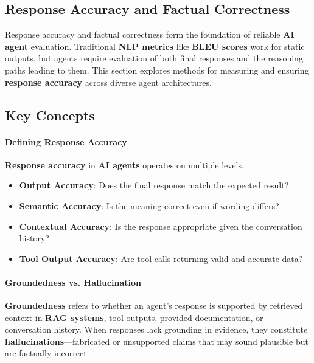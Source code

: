 
\begin{TNtwocol}

\section{Response Accuracy and Factual Correctness}
Response accuracy and factual correctness form the foundation of reliable \textbf{AI agent} evaluation. Traditional \textbf{NLP metrics} like \textbf{BLEU scores} work for static outputs, but agents require evaluation of both final responses and the reasoning paths leading to them. This section explores methods for measuring and ensuring \textbf{response accuracy} across diverse agent architectures.

\subsection*{Key Concepts}

\paragraph{\textbf{Defining Response Accuracy}}

\textbf{Response accuracy} in \textbf{AI agents} operates on multiple levels.

\begin{itemize}
\item \textbf{Output Accuracy}: Does the final response match the expected result?
\item \textbf{Semantic Accuracy}: Is the meaning correct even if wording differs?
\item \textbf{Contextual Accuracy}: Is the response appropriate given the conversation history?
\item \textbf{Tool Output Accuracy}: Are tool calls returning valid and accurate data?
\end{itemize}

\paragraph{\textbf{Groundedness vs. Hallucination}}

\textbf{Groundedness} refers to whether an agent's response is supported by retrieved context in \textbf{RAG systems}, tool outputs, provided documentation, or conversation history. When responses lack grounding in evidence, they constitute \textbf{hallucinations}—fabricated or unsupported claims that may sound plausible but are factually incorrect.


\end{TNtwocol}
